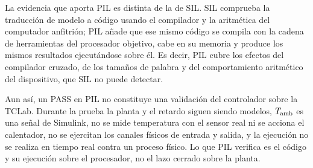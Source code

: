 La evidencia que aporta PIL es distinta de la de SIL. SIL comprueba la traducción de modelo a código
usando el compilador y la aritmética del computador anfitrión; PIL añade que ese mismo código se
compila con la cadena de herramientas del procesador objetivo, cabe en su memoria y produce los
mismos resultados ejecutándose sobre él. Es decir, PIL cubre los efectos del compilador cruzado, de
los tamaños de palabra y del comportamiento aritmético del dispositivo, que SIL no puede detectar.

Aun así, un PASS en PIL no constituye una validación del controlador sobre la TCLab. Durante la
prueba la planta y el retardo siguen siendo modelos, $T_{\mathrm{amb}}$ es una señal de Simulink, no se mide
temperatura con el sensor real ni se acciona el calentador, no se ejercitan los canales físicos de
entrada y salida, y la ejecución no se realiza en tiempo real contra un proceso físico. Lo que PIL
verifica es el código y su ejecución sobre el procesador, no el lazo cerrado sobre la planta.
